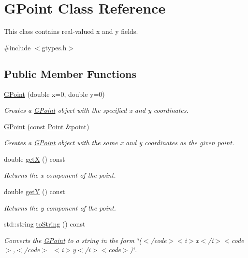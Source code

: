 \hypertarget{classGPoint}{}\section{G\+Point Class Reference}
\label{classGPoint}


This class contains real-\/valued x and y fields.  




{\ttfamily \#include $<$gtypes.\+h$>$}

\subsection*{Public Member Functions}
\begin{DoxyCompactItemize}
\item 
\mbox{\hyperlink{classGPoint_a8c6ed804b0b13bce303a77ff4fbb64b1}{G\+Point}} (double x=0, double y=0)
\begin{DoxyCompactList}\small\item\em Creates a {\ttfamily \mbox{\hyperlink{classGPoint}{G\+Point}}} object with the specified {\ttfamily x} and {\ttfamily y} coordinates. \end{DoxyCompactList}\item 
\mbox{\hyperlink{classGPoint_add4732bf649d02caab4d24487e0f5caa}{G\+Point}} (const \mbox{\hyperlink{classPoint}{Point}} \&point)
\begin{DoxyCompactList}\small\item\em Creates a {\ttfamily \mbox{\hyperlink{classGPoint}{G\+Point}}} object with the same {\ttfamily x} and {\ttfamily y} coordinates as the given point. \end{DoxyCompactList}\item 
double \mbox{\hyperlink{classGPoint_a344385751bee0720059403940d57a13e}{getX}} () const
\begin{DoxyCompactList}\small\item\em Returns the x component of the point. \end{DoxyCompactList}\item 
double \mbox{\hyperlink{classGPoint_aafa51c7f8f38a09febbb9ce7853f77b4}{getY}} () const
\begin{DoxyCompactList}\small\item\em Returns the y component of the point. \end{DoxyCompactList}\item 
std\+::string \mbox{\hyperlink{classGPoint_a1fe5121d6528fdea3f243321b3fa3a49}{to\+String}} () const
\begin{DoxyCompactList}\small\item\em Converts the {\ttfamily \mbox{\hyperlink{classGPoint}{G\+Point}}} to a string in the form {\ttfamily \char`\"{}($<$/code$>$$<$i$>$x$<$/i$>$$<$code$>$,$<$/code$>$~$<$i$>$y$<$/i$>$$<$code$>$)\char`\"{}}. \end{DoxyCompactList}\end{DoxyCompactItemize}


